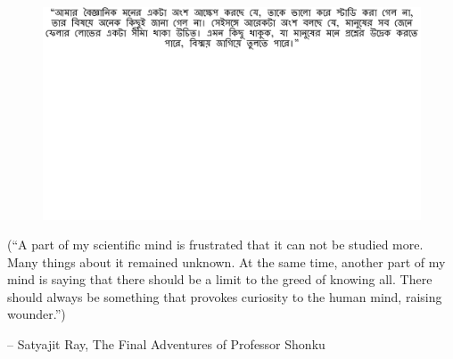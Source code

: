 \thispagestyle{empty}
{}

\vspace*{3cm}

\begin{center}
\begin{figure}
  \centering
  	\vspace{5cm}
    \includegraphics[width=\linewidth]{preamble/quote_1.pdf} 
\end{figure}
\vspace{-4cm}
\small
(``A part of my scientific mind is frustrated that it can not be studied more. Many things about it remained unknown. At the same time, another part of my mind is saying that there should be a limit to the greed of knowing all. There should always be something that provokes curiosity to the human mind, raising wounder.'')

\vspace{2em}
 -- Satyajit Ray, The Final Adventures of Professor Shonku 
\end{center}

\medskip
